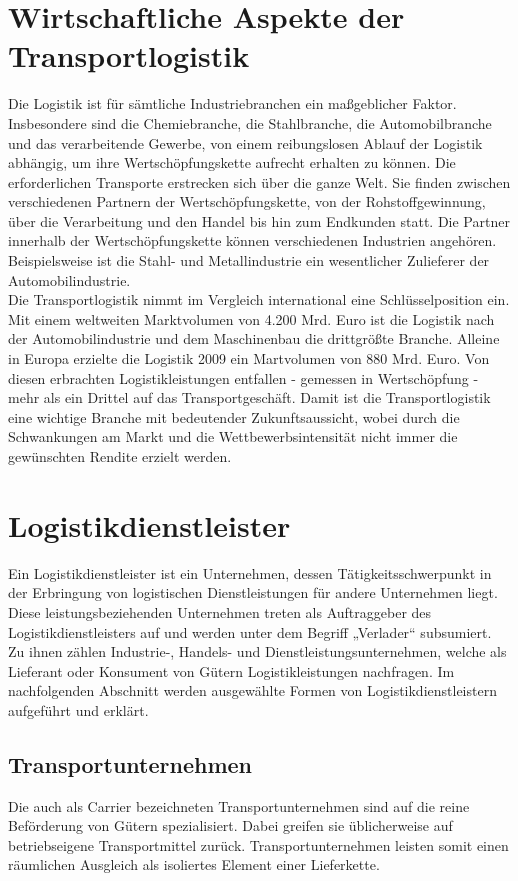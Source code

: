 \documentclass[a4paper,12pt]{scrreprt}
\begin{document}
	\chapter{Wirtschaftliche Aspekte der Transportlogistik}
	
	Die Logistik ist für sämtliche Industriebranchen ein maßgeblicher Faktor. Insbesondere sind die Chemiebranche, die Stahlbranche, die Automobilbranche und das verarbeitende Gewerbe, von einem reibungslosen Ablauf der Logistik abhängig, um ihre Wertschöpfungskette aufrecht erhalten zu können. Die erforderlichen Transporte erstrecken sich über die ganze Welt. Sie finden zwischen verschiedenen Partnern der Wertschöpfungskette, von der Rohstoffgewinnung, über die Verarbeitung und den Handel bis hin zum Endkunden statt. Die Partner innerhalb der Wertschöpfungskette können verschiedenen Industrien angehören. Beispielsweise ist die Stahl- und Metallindustrie ein wesentlicher Zulieferer der Automobilindustrie.\\
	
	Die Transportlogistik nimmt im Vergleich international eine Schlüsselposition ein. Mit einem weltweiten Marktvolumen von 4.200 Mrd. Euro ist die Logistik nach der Automobilindustrie und dem Maschinenbau die drittgrößte Branche. Alleine in Europa erzielte die Logistik 2009 ein Martvolumen von 880 Mrd. Euro. Von diesen erbrachten Logistikleistungen entfallen - gemessen in Wertschöpfung - mehr als ein Drittel auf das Transportgeschäft. Damit ist die Transportlogistik eine wichtige Branche mit bedeutender Zukunftsaussicht, wobei durch die Schwankungen am Markt und die Wettbewerbsintensität nicht immer die gewünschten Rendite erzielt werden.\\
	
	\chapter{Logistikdienstleister}
	Ein Logistikdienstleister ist ein Unternehmen, dessen Tätigkeitsschwerpunkt in der Erbringung von logistischen Dienstleistungen für andere Unternehmen liegt. Diese leistungsbeziehenden Unternehmen treten als Auftraggeber des Logistikdienstleisters auf und werden unter dem Begriff „Verlader“ subsumiert. Zu ihnen zählen Industrie-, Handels- und Dienstleistungsunternehmen, welche als Lieferant oder Konsument von Gütern Logistikleistungen nachfragen. Im nachfolgenden Abschnitt werden ausgewählte Formen von Logistikdienstleistern aufgeführt und erklärt.
	\section{Transportunternehmen}
	Die auch als Carrier bezeichneten Transportunternehmen sind	auf die reine Beförderung von Gütern spezialisiert. Dabei greifen sie üblicherweise auf betriebseigene Transportmittel zurück. Transportunternehmen leisten somit einen räumlichen Ausgleich als isoliertes Element einer Lieferkette. 
\end{document}
